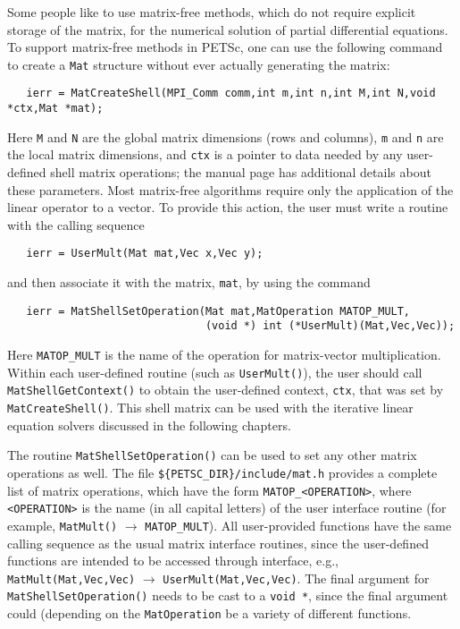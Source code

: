 \label{sec:matrixfree}
Some people like to use matrix-free methods, which do not require
explicit storage of the matrix, for the numerical solution of partial
differential equations.  To support matrix-free methods in PETSc, one
can use the following command to create a {\tt Mat} structure without
ever actually generating the matrix:
\begin{verbatim}
   ierr = MatCreateShell(MPI_Comm comm,int m,int n,int M,int N,void *ctx,Mat *mat);
\end{verbatim}
Here {\tt M} and {\tt N} are the global matrix dimensions (rows and
columns), {\tt m} and {\tt n} are the local matrix dimensions, and
{\tt ctx} is a pointer to data needed by any user-defined shell matrix
operations; the manual page has additional details about these
parameters.  Most matrix-free algorithms require only the application
of the linear operator to a vector. To provide this action, the user
must write a routine with the calling sequence
\begin{verbatim}
   ierr = UserMult(Mat mat,Vec x,Vec y);
\end{verbatim}
and then associate it with the matrix, {\tt mat}, by using the 
command 
\begin{verbatim}
   ierr = MatShellSetOperation(Mat mat,MatOperation MATOP_MULT,
                               (void *) int (*UserMult)(Mat,Vec,Vec));
\end{verbatim}
Here {\tt MATOP\_MULT} is the name of the operation for matrix-vector
multiplication. Within each user-defined routine (such as
{\tt UserMult()}), the user should call 
{\tt MatShellGetContext()} to obtain the user-defined context, {\tt ctx},
that was set by {\tt MatCreateShell()}.
This shell matrix can be used with the iterative linear
equation solvers discussed in the following chapters.

The routine {\tt MatShellSetOperation()} can be used to set any other
matrix operations as well.  The file 
{\tt \$\{PETSC\_DIR\}/include/mat.h} provides a complete list of matrix
operations, which have the form {\tt MATOP\_<OPERATION>}, where {\tt
<OPERATION>} is the name (in all capital letters) of the user
interface routine (for example, {\tt MatMult()} $ \rightarrow $ {\tt MATOP\_MULT}).  All
user-provided functions have the same calling sequence as the
usual matrix interface routines, since the user-defined functions are
intended to be accessed through interface, e.g., 
{\tt MatMult(Mat,Vec,Vec)} $ \rightarrow$ {\tt UserMult(Mat,Vec,Vec)}.
The final argument for {\tt MatShellSetOperation()} needs to be cast
to a {\tt void *}, since the final argument could (depending on the 
{\tt MatOperation} be a variety of different functions.


